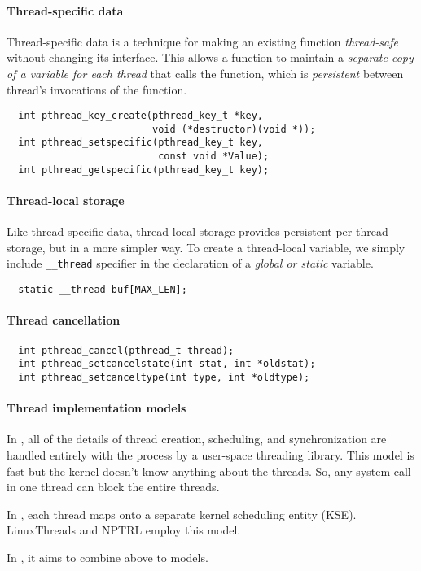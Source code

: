 \documentclass{memo}
\begin{document}
\paragraph{Thread-specific data} Thread-specific data is a technique for
making an existing function {\em thread-safe\/} without changing its
interface. This allows a function to maintain a {\em separate copy of a
  variable for each thread\/} that calls the function, which is {\em
  persistent\/} between thread's invocations of the function.
\begin{verbatim}
  int pthread_key_create(pthread_key_t *key, 
                         void (*destructor)(void *));
  int pthread_setspecific(pthread_key_t key,
                          const void *Value);
  int pthread_getspecific(pthread_key_t key);
\end{verbatim}

\paragraph{Thread-local storage}
Like thread-specific data, thread-local storage provides persistent per-thread
storage, but in a more simpler way. To create a thread-local variable, we
simply include \verb+__thread+ specifier in the declaration of a {\em global
  or static\/} variable.
\begin{verbatim}
  static __thread buf[MAX_LEN];
\end{verbatim}

\paragraph{Thread cancellation}
\begin{verbatim}
  int pthread_cancel(pthread_t thread);
  int pthread_setcancelstate(int stat, int *oldstat);
  int pthread_setcanceltype(int type, int *oldtype);
\end{verbatim}

\paragraph{Thread implementation models}
In , all of the details of
thread creation, scheduling, and synchronization are handled entirely with the
process by a user-space threading library. This model is fast but the kernel
doesn't know anything about the threads. So, any system call in one thread can
block the entire threads.

In , each thread maps onto a
separate kernel scheduling entity (KSE). LinuxThreads and NPTRL employ this
model. 

In , it aims to combine above to
models. 
\end{document}
